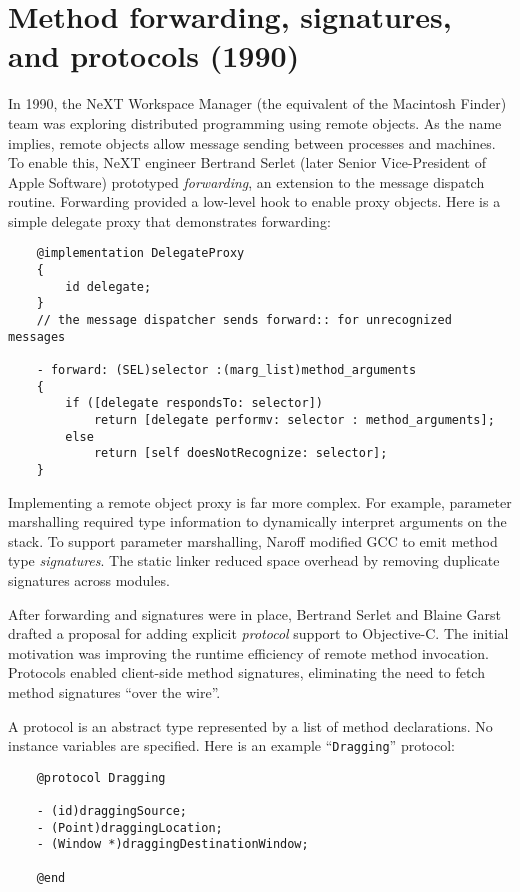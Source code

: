 \documentclass[acmsmall]{acmart}\settopmatter{}
\begin{document}
\section{Method forwarding, signatures, and protocols (1990)}
\label{sec-forwarding/protocols1990}
In 1990, the NeXT Workspace Manager (the equivalent of the Macintosh Finder) team was exploring distributed programming using remote objects. As the name implies, remote objects allow message sending between processes and machines. To enable this, NeXT engineer Bertrand Serlet (later Senior Vice-President of Apple Software) prototyped \emph{forwarding}, an extension to the message dispatch routine. Forwarding provided a low-level hook to enable proxy objects.  Here is a simple delegate proxy that demonstrates forwarding:
\begin{verbatim}
    @implementation DelegateProxy
    {
        id delegate; 
    }
    // the message dispatcher sends forward:: for unrecognized messages

    - forward: (SEL)selector :(marg_list)method_arguments
    {
        if ([delegate respondsTo: selector])
            return [delegate performv: selector : method_arguments];
        else
            return [self doesNotRecognize: selector];
    }
\end{verbatim}

Implementing a remote object proxy is far more complex. For example, parameter marshalling required type information to dynamically interpret arguments on the stack. To support parameter marshalling, Naroff modified GCC to emit method type \emph{signatures}. The static linker reduced space overhead by removing duplicate signatures across modules. 

After forwarding and signatures were in place, Bertrand Serlet and Blaine Garst drafted a proposal for adding explicit \emph{protocol} support to Objective-C. The initial motivation was improving the runtime efficiency of remote method invocation. Protocols enabled client-side method signatures, eliminating the need to fetch method signatures ``over the wire''.

A protocol is an abstract type represented by a list of method declarations. No instance variables are specified. Here is an example ``\verb$Dragging$'' protocol:
\begin{verbatim}
    @protocol Dragging 

    - (id)draggingSource;
    - (Point)draggingLocation;
    - (Window *)draggingDestinationWindow;

    @end
\end{verbatim}
\end{document}
